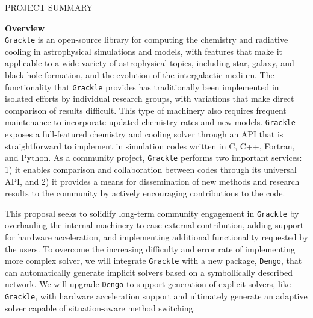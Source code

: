 \documentclass[11pt]{article}
\newcommand{\grackle}{\texttt{Grackle}}
\newcommand{\dengo}{\texttt{Dengo}}
\begin{document}
\thispagestyle{empty}

\clearpage

\clearpage
\begin{center} 
{\large PROJECT SUMMARY}\\
\end{center}

\begin{flushleft}
\noindent
{\bf \large Overview}\\
\grackle{} is an open-source library for computing the chemistry and
radiative cooling in astrophysical simulations and models, with
features that make it applicable to a wide variety of astrophysical
topics, including star, galaxy, and black hole formation, and the
evolution of the intergalactic medium.
The functionality that \grackle{} provides has traditionally
been implemented in isolated efforts by individual research groups,
with variations that make direct comparison of results difficult.
This type of machinery also requires frequent maintenance to
incorporate updated chemistry rates and new models.
\grackle{} exposes a full-featured chemistry and cooling solver
through an API that is straightforward to implement in simulation
codes written in C, C++, Fortran, and Python.
As a community project, \grackle{} performs two important services: 1)
it enables comparison and collaboration between codes through its universal API,
and 2) it provides a means for dissemination of new methods and
research results to the community by actively encouraging
contributions to the code.

This proposal seeks to solidify long-term community engagement in
\grackle{} by overhauling the internal machinery to ease external
contribution, adding support for hardware acceleration, and
implementing additional functionality requested by the users. To
overcome the increasing difficulty and error rate of implementing more
complex solver, we will integrate \grackle{} with a new package,
\dengo{}, that can automatically generate implicit solvers based on a
symbollically described network. We will upgrade \dengo{} to support
generation of explicit solvers, like \grackle{}, with hardware
acceleration support and ultimately generate an adaptive solver
capable of situation-aware method switching.


\end{flushleft}
\end{document}
